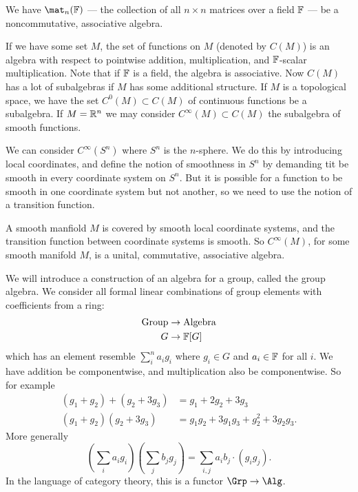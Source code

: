 \begin{ex}
We have $\mat_{n}(\Bbb{F})$ --- the collection of all $n\times n$
matrices over a field $\Bbb{F}$ --- be a noncommutative,
associative algebra.
\end{ex}
\begin{ex}
If we have some set $M$, the set of functions on $M$ (denoted by
$C(M)$) is an algebra with respect to pointwise addition,
multiplication, and $\Bbb{F}$-scalar multiplication. Note that if
$\Bbb{F}$ is a field, the algebra is associative. Now $C(M)$ has
a lot of subalgebras if $M$ has some additional structure. If $M$
is a topological space, we have the set $C^0(M)\subset C(M)$ of
continuous functions be a subalgebra. If $M=\Bbb{R}^{n}$ we may
consider $C^{\infty}(M)\subset C(M)$ the subalgebra of smooth functions.
\end{ex}
\begin{ex}
We can consider $C^{\infty}(S^{n})$ where $S^n$ is the
$n$-sphere. We do this by introducing local coordinates, and
define the notion of smoothness in $S^n$ by demanding tit be
smooth in every coordinate system on $S^n$. But it is possible
for a function to be smooth in one coordinate system but not
another, so we need to use the notion of a transition function.
\end{ex}

A smooth manfiold $M$ is covered by smooth local coordinate
systems, and the transition function between coordinate systems
is smooth. So $C^{\infty}(M)$, for some smooth manifold $M$, is a
unital, commutative, associative algebra.

We will introduce a construction of an algebra for a group,
called the group algebra. We consider all formal linear
combinations of group elements with coefficients from a ring:
\begin{align}
\hbox{Group}&\to\hbox{Algebra}\nonumber\\
G&\to\Bbb{F}[G]
\end{align}
which has an element resemble $\sum_{i}^{n}a_{i}g_{i}$ where
$g_{i}\in G$ and $a_{i}\in\Bbb{F}$ for all $i$. We have addition
be componentwise, and multiplication also be componentwise.
So for example
\begin{subequations}
\begin{align}
(g_{1}+g_{2})+(g_{2}+3g_{3}) &= g_{1}+2g_{2}+3g_{3}\\
(g_{1}+g_{2})(g_{2}+3g_{3}) &= g_{1}g_{2}+3g_{1}g_{3}+g_{2}^{2}+3g_{2}g_{3}.
\end{align}
\end{subequations}
More generally
\begin{equation}
(\sum_{i}a_{i}g_{i})(\sum_{j}b_{j}g_{j})=\sum_{i,j}a_{i}b_{j}\cdot(g_{i}g_{j}).
\end{equation}
In the language of category theory, this is a functor $\Grp\to\Alg$.

